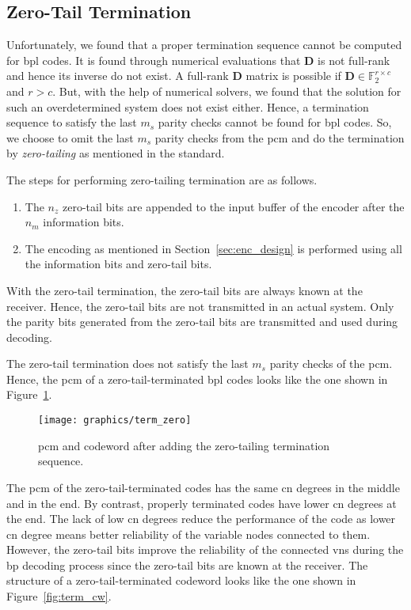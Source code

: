 \subsection{Zero-Tail Termination}
Unfortunately, we found that a proper termination sequence cannot be computed for \gls{bpl} codes. It is found through numerical evaluations that $\mathbf{D}$ is not full-rank and hence its inverse do not exist. A full-rank $\mathbf{D}$ matrix is possible if $\mathbf{D}\in\mathbb{F}_2^{r\times c}$ and $r>c$. But, with the help of numerical solvers, we found that the solution for such an overdetermined system does not exist either. Hence, a termination sequence to satisfy the last $m_s$ parity checks cannot be found for \gls{bpl} codes. So, we choose to omit the last $m_s$ parity checks from the \gls{pcm} and do the termination by \emph{zero-tailing} as mentioned in the standard.

The steps for performing zero-tailing termination are as follows.
\begin{enumerate}
  \item The $n_z$ zero-tail bits are appended to the input buffer of the encoder after the $n_m$ information bits.
  \item The encoding as mentioned in Section~\ref{sec:enc_design} is performed using all the information bits and zero-tail bits.
\end{enumerate}
With the zero-tail termination, the zero-tail bits are always known at the receiver. Hence, the zero-tail bits are not transmitted in an actual system. Only the parity bits generated from the zero-tail bits are transmitted and used during decoding.

The zero-tail termination does not satisfy the last $m_s$ parity checks of the \gls{pcm}. Hence, the \gls{pcm} of a zero-tail-terminated \gls{bpl} codes looks like the one shown in Figure~\ref{fig:pcm_zero}.
\begin{figure}[htbp]
  \centering
  \texttt{[image: graphics/term\_zero]}
  \caption{\gls{pcm} and codeword after adding the zero-tailing termination sequence.}
  \label{fig:pcm_zero}
\end{figure}

The \gls{pcm} of the zero-tail-terminated codes has the same \gls{cn} degrees in the middle and in the end. By contrast, properly terminated codes have lower \gls{cn} degrees at the end. The lack of low \gls{cn} degrees reduce the performance of the code as lower \gls{cn} degree means better reliability of the variable nodes connected to them. However, the zero-tail bits improve the reliability of the connected \glspl{vn} during the \gls{bp} decoding process since the zero-tail bits are known at the receiver. The structure of a zero-tail-terminated codeword looks like the one shown in Figure~\ref{fig:term_cw}.

